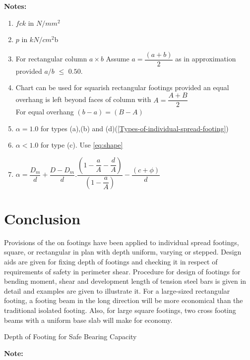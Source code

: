 \textbf{Notes:}
\begin{enumerate}
\item  $fck$ in $N/mm^2$
\item $p$ in $kN/cm^2$b
\item For rectangular column $a\times b$
Assume $a=\dfrac{(a+b)}{2}$ as in approximation provided $a/b$ $\leq$ $0.50.$
\item Chart can be used for squarish rectangular footings provided an 
equal overhang is left beyond faces of column with $A=\dfrac{A+B}{2}$\\
For equal overhang $(b-a)=(B-A)$
\item $\alpha=1.0$ for types (a),(b) and (d)(\fig \ref{Types-of-individual-spread-footing})
\item $\alpha<1.0$ for type (c). Use \eqn \ref{eq:shape}
\item $\alpha=\dfrac{D_m}{d}+\dfrac{D-D_m}{d}.\dfrac{\left(1-\dfrac{a}{A}-\dfrac{d}{A}\right)}{\left(1-\dfrac{a}{A}\right)}-\dfrac{(c+\phi)}{d}$
\end{enumerate}

\section{Conclusion}
Provisions of the   on footings have been applied to individual spread
footings, square, or rectangular in plan with depth uniform, varying or 
stepped. Design aids are given for  fixing depth of footings and checking
it in respect of requirements of safety in perimeter shear. Procedure for
design of footings for bending moment, shear and development length of 
tension steel bars is given in detail and examples are given to illustrate it.
For a large-sized rectangular footing, a footing beam in the long direction 
will be more economical than the traditional isolated footing. Also, for
large square footings, two cross footing beams with a uniform base slab
will make for economy.

\begin{table}[h!]\centering
        \caption{Depth of Footing for Safe Bearing Capacity}
        \label{chaptertable}
\end{table}

\textbf{Note:}

~\cite{is4562000}
~\cite{aci1981aci}
~\cite{aci31877}
\printbibliography
